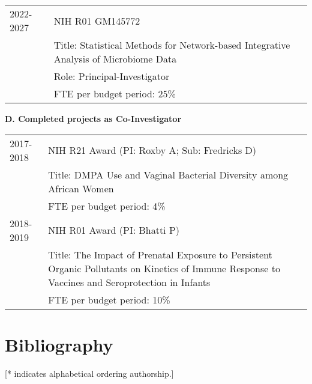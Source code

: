 \documentclass[10pt]{article}
\begin{document}
\begin{table}[H]
\hskip0.9cm\begin{tabular}{p{1.6cm}p{12cm}}
2022-2027 & NIH R01 GM145772 \\
& Title: Statistical Methods for Network-based Integrative Analysis of Microbiome Data \\
& Role: Principal-Investigator\\
& FTE per budget period: 25\%
\end{tabular}
\end{table}
%


 \textbf{D. Completed projects as Co-Investigator}
\begin{table}[H]
\hskip0.9cm\begin{tabular}{p{1.6cm}p{12cm}}
2017-2018 & NIH R21 Award (PI: Roxby A; Sub: Fredricks D)\\
&		Title: DMPA Use and Vaginal Bacterial Diversity among African Women\\
&		FTE per budget period: 4\%\\
2018-2019 & NIH R01 Award (PI: Bhatti P)\\
&	Title: The Impact of Prenatal Exposure to Persistent Organic Pollutants on Kinetics of Immune Response to Vaccines and Seroprotection in Infants\\
&		FTE per budget period: 10\%
\end{tabular}
\end{table}

\section{Bibliography}

[* indicates alphabetical ordering authorship.]
\end{document}
